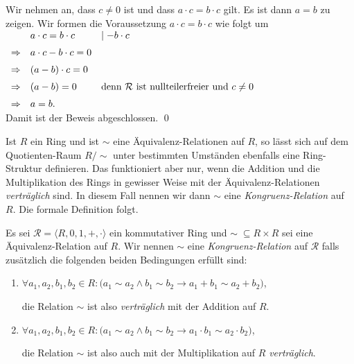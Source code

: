 \proof
Wir nehmen an, dass $c \not = 0$ ist und dass $a \cdot c = b \cdot c$ gilt.  Es ist dann $a = b$ zu zeigen. 
Wir formen die Voraussetzung  $a \cdot c = b \cdot c$ wie folgt um
\\[0.2cm]
\hspace*{1.3cm}
$
\begin{array}[t]{cll}
            & a \cdot c = b \cdot c      & \mid - b \cdot c \\[0.2cm]
\Rightarrow & a \cdot c - b \cdot c  = 0                    \\[0.2cm]
\Rightarrow & (a - b) \cdot c = 0                           \\[0.2cm]
\Rightarrow & (a - b) = 0 & \mbox{denn $\mathcal{R}$ ist nullteilerfreier und $c \not= 0$} \\[0.2cm]
\Rightarrow & a = b.
\end{array}
$
\\[0.2cm]
Damit ist der Beweis abgeschlossen. \qed
\vspace*{0.2cm}

Ist $R$ ein Ring und ist $\sim$ eine \"{A}quivalenz-Relationen auf $R$,
so l\"{a}sst sich auf dem Quotienten-Raum $R/\!\sim$ unter bestimmten Umst\"{a}nden ebenfalls eine Ring-Struktur
definieren.   Das funktioniert aber nur, wenn die Addition und die Multiplikation des Rings in gewisser
Weise mit der \"{A}quivalenz-Relationen \emph{vertr\"{a}glich} sind.  In diesem Fall nennen wir dann $\sim$ eine
\emph{Kongruenz-Relation} auf $R$.  Die formale Definition folgt.

\begin{Definition}
Es sei $\mathcal{R} = \langle R, 0, 1, +, \cdot \rangle$ ein kommutativer Ring und $\sim\; \subseteq R \times R$ sei eine
\"{A}quivalenz-Relation auf $R$.   Wir nennen $\sim$ eine {\color{blue}\emph{Kongruenz-Relation}} auf $\mathcal{R}$ 
falls zus\"{a}tzlich die folgenden beiden Bedingungen erf\"{u}llt sind:
\begin{enumerate}
\item $\forall a_1, a_2, b_1, b_2 \in R: 
       \bigl(a_1 \sim a_2 \wedge b_1 \sim b_2 \rightarrow a_1 + b_1 \sim a_2 + b_2\bigr)
      $,

      die Relation $\sim$ ist also \emph{vertr\"{a}glich} mit der Addition auf $R$.
\item $\forall a_1, a_2, b_1, b_2 \in R: 
       \bigl(a_1 \sim a_2 \wedge b_1 \sim b_2 \rightarrow a_1 \cdot b_1 \sim a_2 \cdot b_2\bigr)
      $,

      die Relation $\sim$ ist also auch mit der Multiplikation auf $R$ \emph{vertr\"{a}glich}.
      \eoxs
\end{enumerate}
\end{Definition}
  
